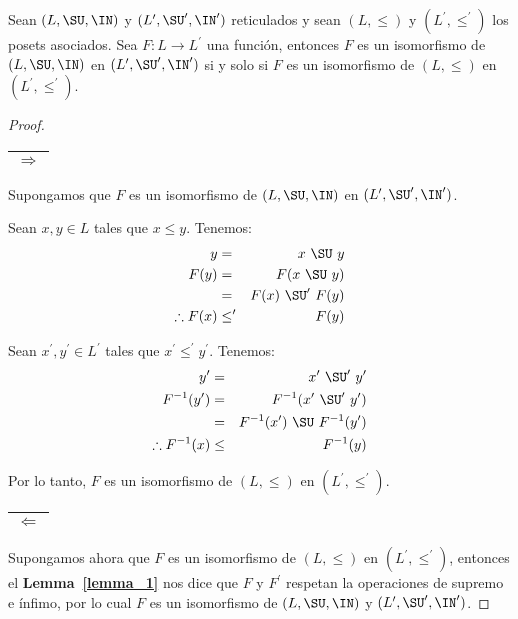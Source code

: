   \begin{lemma}
    \PN Sean $(L, \SU, \IN)$ y $(L^{\prime}, \SU^{\prime}, \IN^{\prime})$ reticulados y sean $(L, \leq)$ y $(L^{\prime},
    \leq^{\prime})$ los posets asociados. Sea $F: L \rightarrow L^{\prime}$ una función, entonces $F$ es un isomorfismo
    de $(L, \SU, \IN)$ en $ (L^{\prime}, \SU^{\prime}, \IN^{\prime})$ si y solo si $F$ es un isomorfismo de $(L, \leq)$
    en $(L^{\prime}, \leq^{\prime})$.
  \end{lemma}
  \begin{proof}
    \PN \begin{tabular}{|c|} \hline $\Rightarrow$ \\\hline \end{tabular} Supongamos que $F$ es un isomorfismo de
    $(L, \SU, \IN)$ en $ (L^{\prime}, \SU^{\prime}, \IN^{\prime})$.

    \PN Sean $x, y \in L$ tales que $x \leq y$. Tenemos:
    \begin{eqnarray*}
      y &=& x \ \SU \ y \\
      F(y) &=& F(x \ \SU \ y) \\
      &=& F(x) \ \SU^{\prime} \ F(y) \\
      \therefore F(x) &\leq^{\prime}& F(y)
    \end{eqnarray*}

    \PN Sean $x^{\prime}, y^{\prime} \in L^{\prime}$ tales que $x^{\prime} \leq^{\prime} y^{\prime}$. Tenemos:
    \begin{eqnarray*}
      y^{\prime} &=& x^{\prime} \ \SU^{\prime} \ y^{\prime} \\
      F^{-1}(y^{\prime}) &=& F^{-1}(x^{\prime} \ \SU^{\prime} \ y^{\prime}) \\
      &=& F^{-1}(x^{\prime}) \ \SU \ F^{-1}(y^{\prime}) \\
      \therefore F^{-1}(x) &\leq& F^{-1}(y)
    \end{eqnarray*}

    \PN Por lo tanto, $F$ es un isomorfismo de $(L, \leq)$ en $(L^{\prime}, \leq^{\prime})$.

    \PN \begin{tabular}{|c|} \hline $\Leftarrow$ \\\hline \end{tabular} Supongamos ahora que $F$ es un isomorfismo
    de $(L, \leq)$ en $(L^{\prime}, \leq^{\prime})$, entonces el \textbf{Lemma~\ref{lemma_1}} nos dice que $F$ y
    $F^{\prime}$ respetan la operaciones de supremo e ínfimo, por lo cual $F$ es un isomorfismo de $(L, \SU, \IN)$ y
    $(L^{\prime}, \SU^{\prime}, \IN^{\prime})$.
  \end{proof}

